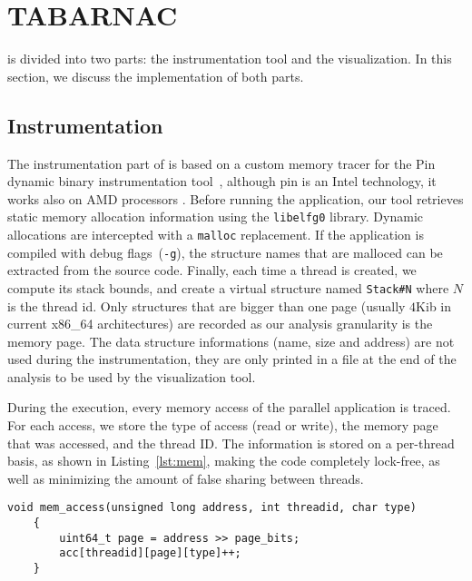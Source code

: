 
\section{TABARNAC}
\label{sec:design}

\TABARNAC is divided into two parts: the instrumentation tool and the
visualization. In this section, we discuss the implementation of both parts.

\subsection{Instrumentation}
\label{sec:design-impl}

The instrumentation part of \TABARNAC is based on a custom memory tracer for
the Pin dynamic binary instrumentation tool~\cite{Luk05Pin}, although pin is
an Intel technology, it works also on AMD processors
 .
Before running the application, our tool retrieves static memory allocation
information using the \texttt{libelfg0} library. Dynamic allocations are
intercepted with a \texttt{malloc} replacement. If the application is
compiled with debug flags~(\texttt{-g}), the structure names that are malloced can be extracted from the source
code. Finally, each time a thread is created, we compute
its stack bounds, and create a virtual structure named \texttt{Stack\#N} where
$N$ is the thread id. Only structures that are bigger than one page (usually
$4$Kib in current x86\_64 architectures) are recorded as our
analysis granularity is the memory page. The data structure informations (name,
size and address) are not used during the instrumentation, they are only
printed in a file at the end of the analysis to be used by the visualization
tool.

During the execution, every memory access of the parallel application is traced.
For each access, we store the type of access (read or write), the memory page that was accessed, and the thread ID.
The information is stored on a per-thread basis, as shown in
Listing~\ref{lst:mem}, making the code completely lock-free, as well as minimizing the amount of false sharing between threads.

\begin{lstlisting}[caption={Code executed on each memory access. The \texttt{address}, \texttt{threadid} and \texttt{type} parameters are provided by Pin.},label=lst:mem]
	void mem_access(unsigned long address, int threadid, char type)
	{
		uint64_t page = address >> page_bits;
		acc[threadid][page][type]++;
	}

\end{lstlisting}


